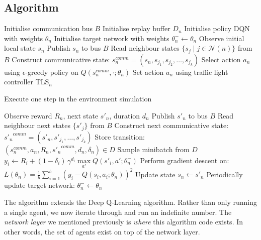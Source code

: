 \documentclass[a4paper]{report}
\begin{document}
\subsection{Algorithm}

\begin{algorithm}[H]
  \caption{Communicative Deep Q-Learning}
  \begin{algorithmic}[1]
  \State Initialise communication bus $B$
    \State Initialise replay buffer $D_n$
    \State Initialise policy DQN with weights $\theta_n$
    \State Initialise target network with weights $\theta_n^- \leftarrow \theta_n$
  \EndFor
        \State Observe initial local state $s_n$
        \State Publish $s_n$ to bus $B$
    \EndFor
        \State Read neighbour states $\{s_j \mid j \in \mathcal{N}(n)\}$ from $B$
        \State Construct communicative state: $s_n^{comm} = (s_n, s_{j_1}, s_{j_2}, \dots, s_{j_k})$
        \State Select action $a_n$ using $\epsilon$-greedy policy on $Q(s_n^{comm}, \cdot; \theta_n)$
        \State Set action $a_n$ using traffic light controller $\text{TLS}_n$
      \EndFor

      \State Execute one step in the environment simulation

        \State Observe reward $R_n$, next state $s'_n$, duration $d_n$
        \State Publish $s'_n$ to bus $B$
        \State Read neighbour next states $\{s'_j\}$ from $B$
        \State Construct next communicative state: ${s'_n}^{comm} = (s'_n, s'_{j_1}, \dots, s'_{j_k})$
        \State Store transition: $(s_n^{comm}, a_n, R_n, {s'_n}^{comm}, d_n, \delta_n) \in D$
        \State Sample minibatch from $D$
          \State $y_i \leftarrow R_i + (1 - \delta_i)\,\gamma^{d_i} \underset{a'}\max Q(s'_i, a'; \theta_n^-)$
        \EndFor
        \State Perform gradient descent on: $L(\theta_n) = \frac{1}{b} \sum_{i=1}^{b} \left(y_i - Q(s_i, a_i; \theta_n)\right)^2$
        \State Update state $s_n \leftarrow s'_n$
        \State Periodically update target network: $\theta_n^- \leftarrow \theta_n$
      \EndFor
    \EndFor
  \EndFor
  \end{algorithmic}
\end{algorithm}

The algorithm\footnotemark{} extends the Deep Q-Learning algorithm. Rather than only running a single agent, we now iterate through and run an indefinite number. The \emph{network layer} we mentioned previously is \emph{where} this algorithm code exists. In other words, the set of agents exist on top of the network layer.
\end{document}
